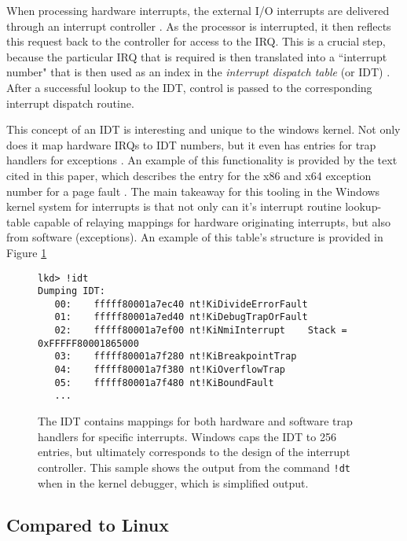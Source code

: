 \documentclass[10pt,draftclsnofoot,onecolumn]{IEEEtran}
\begin{document}
\par When processing hardware interrupts, the external I/O interrupts are delivered through an interrupt controller \cite{win:1}.
As the processor is interrupted, it then reflects this request back to the controller for access to the IRQ.
This is a crucial step, because the particular IRQ that is required is then translated into a ``interrupt number" that is then used as an index in the \textit{interrupt dispatch table} (or IDT) \cite{win:1}.
After a successful lookup to the IDT, control is passed to the corresponding interrupt dispatch routine.

\par This concept of an IDT is interesting and unique to the windows kernel.
Not only does it map hardware IRQs to IDT numbers, but it even has entries for trap handlers for exceptions \cite{win:1}.
An example of this functionality is provided by the text cited in this paper, which describes the entry for the x86 and x64 exception number for a page fault \cite{win:1}.
The main takeaway for this tooling in the Windows kernel system for interrupts is that not only can it's interrupt routine lookup-table capable of relaying mappings for hardware originating interrupts, but also from software (exceptions).
An example of this table's structure is provided in Figure \ref{code:idt_sample}

\begin{figure}[h]
\begin{lstlisting}
lkd> !idt
Dumping IDT:
   00:    fffff80001a7ec40 nt!KiDivideErrorFault
   01:    fffff80001a7ed40 nt!KiDebugTrapOrFault
   02:    fffff80001a7ef00 nt!KiNmiInterrupt    Stack = 0xFFFFF80001865000
   03:    fffff80001a7f280 nt!KiBreakpointTrap
   04:    fffff80001a7f380 nt!KiOverflowTrap
   05:    fffff80001a7f480 nt!KiBoundFault
   ...
\end{lstlisting}
\centering
\captionsetup{justification=centering}
\caption{
  The IDT contains mappings for both hardware and software trap handlers for specific interrupts.
  Windows caps the IDT to 256 entries, but ultimately corresponds to the design of the interrupt controller.
  This sample shows the output from the command \texttt{!dt} when in the kernel debugger, which is simplified output.
}
\label{code:idt_sample}
\end{figure}

\subsection{Compared to Linux}
\label{sub:Interrupts Linux}
\end{document}
